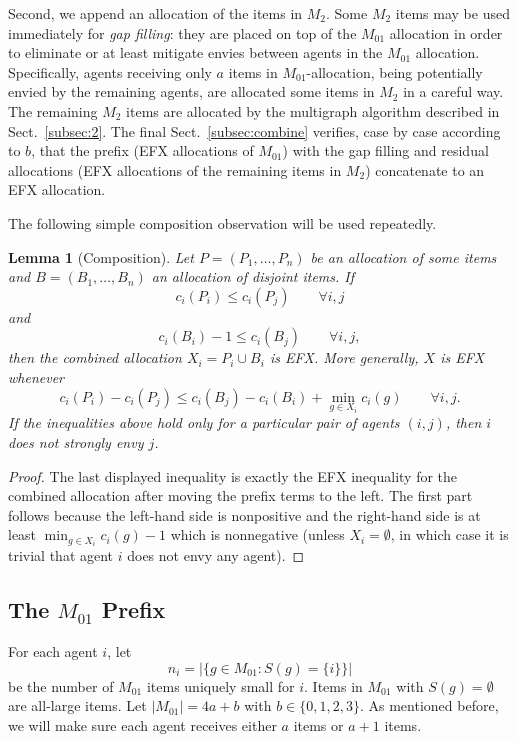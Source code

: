 \documentclass{article}
\newtheorem{lemma}{Lemma}
\theoremstyle{definition}
\begin{document}
Second, we append an allocation of the items in $M_2$.  Some $M_2$ items may
be used immediately for \emph{gap filling}: they are placed on top of the
$M_{01}$ allocation in order to eliminate or at least mitigate envies between agents in the $M_{01}$ allocation.
Specifically, agents receiving only $a$ items in $M_{01}$-allocation, being potentially envied by the remaining agents, are allocated some items in $M_2$ in a careful way.
The remaining
$M_2$ items are allocated by the multigraph algorithm described in Sect.~\ref{subsec:2}.  
The final Sect.~\ref{subsec:combine} verifies, case by case according to $b$, that the prefix (EFX allocations of $M_{01}$) with the gap filling and
residual allocations (EFX allocations of the remaining items in $M_2$) concatenate to an EFX allocation.


The following simple composition observation will be used repeatedly.

\begin{lemma}[Composition]\label{lem:composition}
Let $P=(P_1,\ldots,P_n)$ be an allocation of some items and $B=(B_1,\ldots,B_n)$ an allocation of disjoint
items.  If
\[
 c_i(P_i)\le c_i(P_j)\qquad\forall i,j
\]
and
\[
 c_i(B_i)-1\le c_i(B_j)\qquad\forall i,j,
\]
then the combined allocation $X_i=P_i\cup B_i$ is EFX. %
More generally, $X$ is EFX whenever
\[
 c_i(P_i)-c_i(P_j)
 \le c_i(B_j)-c_i(B_i)+\min_{g\in X_i}c_i(g)
 \qquad\forall i,j.
\]
If the inequalities above hold only for a particular pair of agents $(i,j)$, then $i$ does not strongly envy $j$.
\end{lemma}

\begin{proof}
The last displayed inequality is exactly the EFX inequality for the
combined allocation after moving the prefix terms to the left.  The first
part follows because the left-hand side is nonpositive and the right-hand side is at least $\min_{g\in X_i}c_i(g)-1$ which is nonnegative (unless $X_i=\emptyset$, in which case it is trivial that agent $i$ does not envy any agent).
\end{proof}

\subsection{The $M_{01}$ Prefix}
\label{subsec:01}
For each agent $i$, let
\[
 n_i=\left|\{g\in M_{01}:S(g)=\{i\}\}\right|
\]
be the number of $M_{01}$ items uniquely small for $i$.  Items in $M_{01}$
with $S(g)=\emptyset$ are all-large items.
Let $|M_{01}|=4a+b$ with $b\in\{0,1,2,3\}$.
As mentioned before, we will make sure each agent receives either $a$ items or $a+1$ items.
\end{document}
